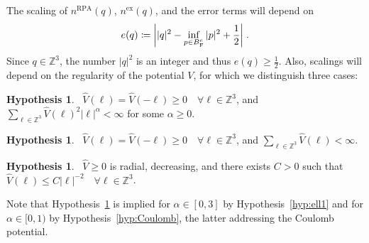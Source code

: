 \documentclass[12pt,a4paper]{article}
\numberwithin{equation}{section}
\newcommand{\1}{\mathbb{I}}
\newcommand{\ex}{\mathrm{ex}}
\newcommand{\F}{\mathrm{F}}
\newcommand{\RPA}{\mathrm{RPA}}
\newcommand{\Zstar}{\mathbb{Z}^3} %
\newcommand{\Z}{\mathbb{Z}}
\newcommand{\half}{\frac{1}{2}}
\theoremstyle{plain}
\theoremstyle{definition}
\newtheorem{hypothesis}[theorem]{Hypothesis}
\theoremstyle{remark}
\theoremstyle{plain}
\theoremstyle{definition}
\theoremstyle{remark}
\begin{document}
The scaling of $ n^{\RPA}(q) $, $ n^{\ex}(q) $, and the error terms will depend on
\begin{equation} \label{eq:eq}
	e(q)
	\coloneq \abs{|q|^2 - \inf_{p \in B_{\F}^c} |p|^2 + \half} \;.
\end{equation}
Since $ q \in \Z^3 $, the number $ |q|^2 $ is an integer and thus $ e(q) \ge \half $.
Also, scalings will depend on the regularity of the potential $ V $, for which we distinguish three cases:
\begin{hypothesis}~\label{hyp:alpha}
$ \hat{V}(\ell) = \hat{V}(-\ell) \ge 0 \quad \forall \ell \in \Z^3 $, and $ \sum_{\ell \in \Zstar} \hat{V}(\ell)^2 |\ell|^\alpha < \infty $ for some $ \alpha \ge 0 $.
\end{hypothesis}
\begin{hypothesis}~\label{hyp:ell1}
$ \hat{V}(\ell) = \hat{V}(-\ell) \ge 0 \quad \forall \ell \in \Z^3 $, and $ \sum_{\ell \in \Zstar} \hat{V}(\ell) < \infty $.
\end{hypothesis}
\begin{hypothesis}~\label{hyp:Coulomb}
$ \hat{V} \ge 0 $ is radial, decreasing, and there exists $ C > 0 $ such that\\
$ \hat{V}(\ell) \le C |\ell|^{-2} \quad \forall \ell \in \Z^3 $.
\end{hypothesis}
Note that Hypothesis~\ref{hyp:alpha} is implied for $ \alpha \in [0,3] $ by Hypothesis~\eqref{hyp:ell1} and for $ \alpha \in [0,1) $ by Hypothesis~\eqref{hyp:Coulomb}, the latter addressing the Coulomb potential.
\end{document}

